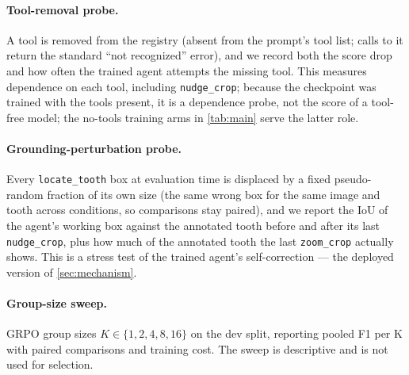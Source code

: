 \paragraph{Tool-removal probe.}
A tool is removed from the registry (absent from the prompt's tool list; calls to it return the
standard ``not recognized'' error), and we record both the score drop and how often the trained
agent attempts the missing tool. This measures dependence on each tool, including
\texttt{nudge\_crop}; because the checkpoint was trained with the tools present, it is a
dependence probe, not the score of a tool-free model; the no-tools training arms in
\cref{tab:main} serve the latter role. 

\paragraph{Grounding-perturbation probe.}
Every \texttt{locate\_tooth} box at evaluation time is displaced by a fixed pseudo-random
fraction of its own size (the same wrong box for the same image and tooth across conditions, so
comparisons stay paired), and we report the IoU of the agent's working box against the annotated
tooth before and after its last \texttt{nudge\_crop}, plus how much of the annotated tooth the
last \texttt{zoom\_crop} actually shows. This is a stress test of the trained agent's
self-correction --- the deployed version of \cref{sec:mechanism}. 

\paragraph{Group-size sweep.}
GRPO group sizes $K \in \{1, 2, 4, 8, 16\}$ on the dev split, reporting pooled F1 per K with
paired comparisons and training cost. The sweep is descriptive and is not used for selection. 

